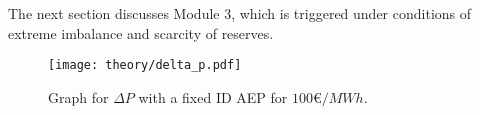 \documentclass[class=scrbook, crop=false]{standalone}
\begin{document}
The next section discusses Module 3, which is triggered under conditions of extreme imbalance and scarcity of reserves.




 \begin{figure}[ht]
            \centering
            \texttt{[image: theory/delta\_p.pdf]}
             \caption[Graph for $\Delta P$ with a fixed ID AEP for $100€/MWh$]{Graph for $\Delta P$ with a fixed ID AEP for $100€/MWh$.}
            \label{fig::delta_p_graph}
 \end{figure}

\end{document}
